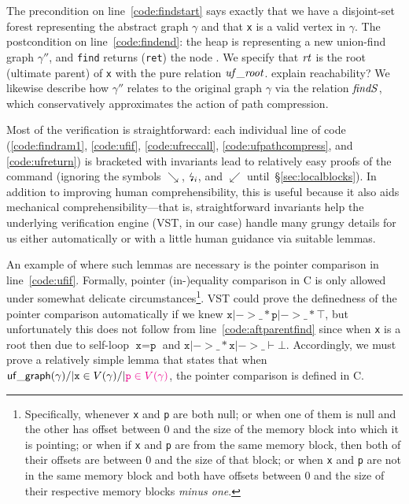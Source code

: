 The precondition on line~\ref{code:findstart} says exactly that we have a disjoint-set forest representing the abstract graph $\gamma$ and that \texttt{x} is a valid vertex in $\gamma$.  The postcondition on line~\ref{code:findend}: the heap is representing a new union-find graph $\gamma''$, and \texttt{find} returns (\texttt{ret}) the node .  We specify that $\mathit{rt}$
is the root (ultimate parent) of \texttt{x} with the pure relation $\mathit{uf\_root}$.  {\color{magenta} explain reachability?} We likewise describe how $\gamma''$ relates to the original graph $\gamma$ via the relation $\mathit{findS}$, which conservatively approximates the action of path compression.

Most of the verification is straightforward: each individual line of code (\ref{code:findram1}, \ref{code:ufif}, \ref{code:ufreccall}, \ref{code:ufpathcompress}, and \ref{code:ufreturn}) is bracketed with invariants lead to relatively easy proofs of the command (ignoring the symbols $\searrow$, $\mbox{\lightning}_i$, and $\swarrow$ until~\S\ref{sec:localblocks}).  In addition to improving human comprehensibility, this is useful because it also aids mechanical comprehensibility---that is, straightforward invariants help the underlying verification engine (VST, in our case) handle many grungy details for us either automatically or with a little human guidance via suitable lemmas.

An example of where such lemmas are necessary is the pointer comparison in line~\ref{code:ufif}.
Formally, pointer (in-)equality comparison in C is only allowed under somewhat delicate circumstances\footnote {\label{footnote:pointereq}Specifically, whenever \texttt{x} and \texttt{p} are both null; or when one of them is null and the other has offset between 0 and the size of the memory block into which it is pointing; or when if \texttt{x} and \texttt{p} are from the same memory block, then both of their offsets are between 0 and the size of that block; or when \texttt{x} and \texttt{p} are not in the same memory block and both have offsets between 0 and the size of their respective memory blocks \emph{minus one}.}.  VST could prove the definedness of the pointer comparison automatically if we knew $\texttt{x} |-> \_ * \texttt{p} |-> \_ * \top$, but
unfortunately this does not follow from line~\ref{code:aftparentfind} since when \texttt{x} is a root then due to self-loop $\texttt{x}=\texttt{p}$ and $\texttt{x} |-> \_ * \texttt{x} |-> \_ \vdash \bot$.  Accordingly, we must prove a relatively simple lemma that states that when $\mathsf{uf\_graph}(\gamma) /| \texttt{x} \in V(\gamma) /| {\color{magenta} \texttt{p} \in V(\gamma)}$,
the pointer comparison is defined in C.


